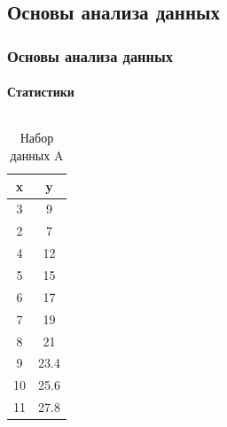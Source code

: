 \documentclass[xcolor=table]{beamer}
\begin{document}
\subsection{Основы анализа данных}
\begin{frame}
  \frametitle{Основы анализа данных}
  \framesubtitle{Статистики}
  \vspace{-20pt}

  \begin{columns}

    \begin{column}{0.35\textwidth}
      \begin{table}
        \caption{Набор данных A}
        \begin{tabular}{|c|c|}
          \hline
          x & y \\ \hline
          3 & 9 \\ \hline 2 & 7 \\ \hline 4 & 12 \\ \hline 5 & 15 \\ \hline 6 & 17 \\ \hline
          7 & 19 \\ \hline 8 & 21 \\ \hline 9 & 23.4 \\ \hline 10 & 25.6 \\ \hline 11 & 27.8 \\
          \hline
        \end{tabular}
      \end{table}
    \end{column}


\end{columns}
\end{frame}
\end{document}

